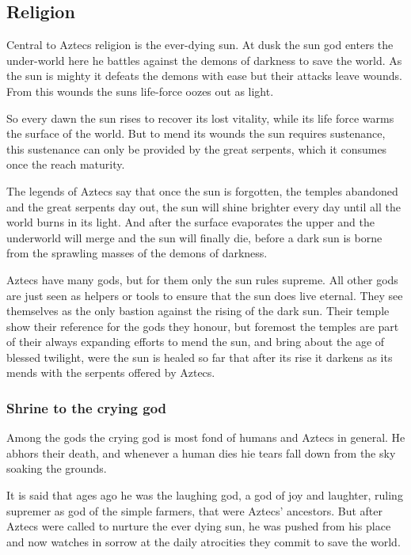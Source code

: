 \documentclass[a4paper]{article}
\begin{document}
	\subsection{Religion}
		Central to \gls{Aztecs} religion is the ever-dying sun.
		At dusk the sun god enters the under-world here he battles against
		the demons of darkness to save the world.
		As the sun is mighty it defeats the demons with ease but their attacks leave wounds.
		From this wounds the suns life-force oozes out as light.

		So every dawn the sun rises to recover its lost vitality,
		while its life force warms the surface of the world.
		But to mend its wounds the sun requires sustenance,
		this sustenance can only be provided by the great serpents,
		which it consumes once the reach maturity.

		The legends of \gls{Aztecs} say that once the sun is forgotten,
		the temples abandoned and the great serpents day out,
		the sun will shine brighter every day until all the world burns in its light.
		And after the surface evaporates the upper and the underworld will merge
		and the sun will finally die,
		before a dark sun is borne from the sprawling masses of the demons of darkness.

		\Gls{Aztecs} have many gods, but for them only the sun rules supreme.
		All other gods are just seen as helpers or tools to ensure that the sun does live eternal.
		They see themselves as the only bastion against the rising of the dark sun.
		Their temple show their reference for the gods they honour,
		but foremost the temples are part of their always expanding efforts to mend the sun,
		and bring about the age of blessed twilight,
		were the sun is healed so far that after its rise it darkens as its mends with the
		serpents offered by \gls{Aztecs}.

		\subsubsection{Shrine to the crying god}
			Among the gods the crying god is most fond of humans and \gls{Aztecs} in general.
			He abhors their death, and whenever a human dies hie tears fall down from the sky
			soaking the grounds.

			It is said that ages ago he was the laughing god, a god of joy and laughter,
			ruling supremer as god of the simple farmers,
			that were \gls{Aztecs}' ancestors.
			But after \gls{Aztecs} were called to nurture the ever dying sun,
			he was pushed from his place and now watches in sorrow at the daily atrocities they
			commit to save the world.
\end{document}
